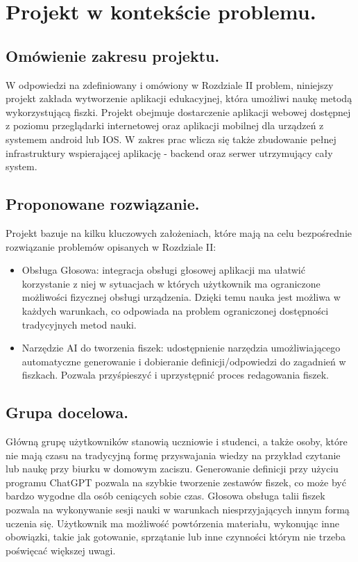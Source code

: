 \chapter{Projekt w kontekście problemu.}

\section{Omówienie zakresu projektu.}

W odpowiedzi na zdefiniowany i omówiony w Rozdziale II problem, niniejszy projekt zakłada wytworzenie aplikacji edukacyjnej, która umożliwi naukę metodą wykorzystującą fiszki. Projekt obejmuje dostarczenie aplikacji webowej dostępnej z poziomu przeglądarki internetowej oraz aplikacji mobilnej dla urządzeń z systemem android lub IOS. W zakres prac wlicza się także zbudowanie pełnej infrastruktury wspierającej aplikację - backend oraz serwer utrzymujący cały system.

\section{Proponowane rozwiązanie.}

Projekt bazuje na kilku kluczowych założeniach, które mają na celu bezpośrednie rozwiązanie problemów opisanych w Rozdziale II:

\begin{itemize}
    \item Obsługa Głosowa: integracja obsługi głosowej aplikacji ma ułatwić korzystanie z niej w sytuacjach w których użytkownik ma ograniczone możliwości fizycznej obsługi urządzenia. Dzięki temu nauka jest możliwa w każdych warunkach, co odpowiada na problem ograniczonej dostępności tradycyjnych metod nauki.
    \item Narzędzie AI do tworzenia fiszek: udostępnienie narzędzia umożliwiającego automatyczne generowanie i dobieranie definicji/odpowiedzi do zagadnień w fiszkach. Pozwala przyśpieszyć i uprzystępnić proces redagowania fiszek.
    \end{itemize}

\section{Grupa docelowa.}

Główną grupę użytkowników stanowią uczniowie i studenci, a także osoby, które nie mają czasu na tradycyjną formę przyswajania wiedzy na przykład czytanie lub naukę przy biurku w domowym zaciszu. Generowanie definicji przy użyciu programu ChatGPT pozwala na szybkie tworzenie zestawów fiszek, co może być bardzo wygodne dla osób ceniących sobie czas. Głosowa obsługa talii fiszek pozwala na wykonywanie sesji nauki w warunkach niesprzyjających innym formą uczenia się. Użytkownik ma możliwość powtórzenia materiału, wykonując inne obowiązki, takie jak gotowanie, sprzątanie lub inne czynności którym nie trzeba poświęcać większej uwagi.

